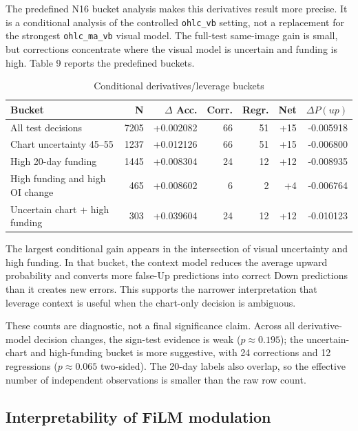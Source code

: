 \documentclass[14pt,a4paper]{extarticle}
\newcommand{\code}[1]{\texttt{#1}}
\begin{document}
The predefined N16 bucket analysis makes this derivatives result more precise. It is a conditional analysis of the controlled \code{ohlc\_vb} setting, not a replacement for the strongest \code{ohlc\_ma\_vb} visual model. The full-test same-image gain is small, but corrections concentrate where the visual model is uncertain and funding is high. Table 9 reports the predefined buckets.

\begin{table}[H]
\caption{Conditional derivatives/leverage buckets}
\begin{center}
\small
\setlength{\tabcolsep}{3pt}
\begin{tabular}{p{}rrrrrr}
\toprule
\textbf{Bucket} & \textbf{N} & \textbf{$\Delta$ Acc.} & \textbf{Corr.} & \textbf{Regr.} & \textbf{Net} & \textbf{$\Delta P(up)$}\\
\midrule
All test decisions & 7205 & +0.002082 & 66 & 51 & +15 & -0.005918\\
Chart uncertainty 45--55 & 1237 & +0.012126 & 66 & 51 & +15 & -0.006800\\
High 20-day funding & 1445 & +0.008304 & 24 & 12 & +12 & -0.008935\\
High funding and high OI change & 465 & +0.008602 & 6 & 2 & +4 & -0.006764\\
Uncertain chart + high funding & 303 & +0.039604 & 24 & 12 & +12 & -0.010123\\
\bottomrule
\end{tabular}
\end{center}
\end{table}

The largest conditional gain appears in the intersection of visual uncertainty and high funding. In that bucket, the context model reduces the average upward probability and converts more false-Up predictions into correct Down predictions than it creates new errors. This supports the narrower interpretation that leverage context is useful when the chart-only decision is ambiguous.

These counts are diagnostic, not a final significance claim. Across all derivative-model decision changes, the sign-test evidence is weak ($p\approx0.195$); the uncertain-chart and high-funding bucket is more suggestive, with 24 corrections and 12 regressions ($p\approx0.065$ two-sided). The 20-day labels also overlap, so the effective number of independent observations is smaller than the raw row count.

\subsection{Interpretability of FiLM modulation}
\end{document}
